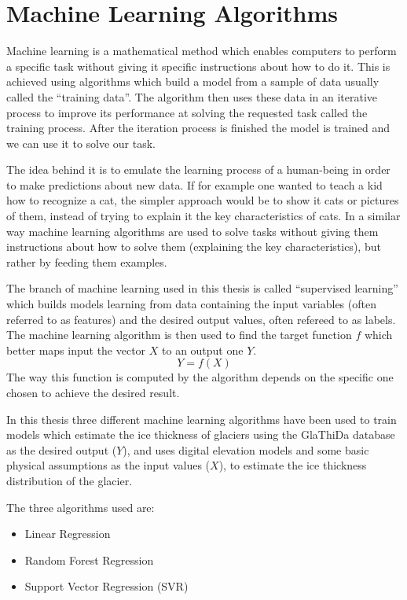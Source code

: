 \section{Machine Learning Algorithms}\label{ML}
Machine learning is a mathematical method which enables computers to perform a specific task without giving it specific instructions about how to do it. This is achieved using algorithms which build a model from a sample of data usually called the ``training data''. The algorithm then uses these data in an iterative process to improve its performance at solving the requested task called the training process. After the iteration process is finished the model is trained and we can use it to solve our task. 

The idea behind it is to emulate the learning process of a human-being in order to make predictions about new data. If for example one wanted to teach a kid how to recognize a cat, the simpler approach would be to show it cats or pictures of them, instead of trying to explain it the key characteristics of cats. In a similar way machine learning algorithms are used to solve tasks without giving them instructions about how to solve them (explaining the key characteristics), but rather by feeding them examples.

The branch of machine learning used in this thesis is called ``supervised learning'' which builds models learning from data containing the input variables (often referred to as features) and the desired output values, often refereed to as labels.
The machine learning algorithm is then used to find the target function $f$ which better maps input the vector $X$ to an output one $Y$.
\begin{equation}
Y = f(X)
\end{equation}
The way this function is computed by the algorithm depends on the specific one chosen to achieve the desired result.

In this thesis three different machine learning algorithms have been used to train models which estimate the ice thickness of glaciers using the GlaThiDa database as the desired output ($Y$), and uses digital elevation models and some basic physical assumptions as the input values ($X$), to estimate the ice thickness distribution of the glacier.

The three algorithms used are:
\begin{itemize}
	\item Linear Regression
	\item Random Forest Regression
	\item Support Vector Regression (SVR)
\end{itemize}

